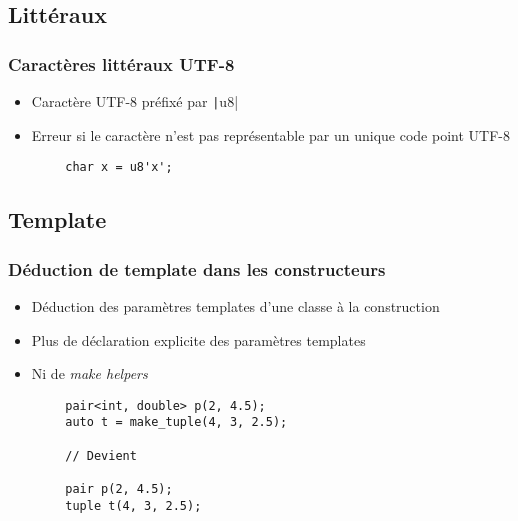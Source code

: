 \documentclass[C++.tex]{subfiles}
\begin{document}
\subsection*{Littéraux}
\begin{frame}[fragile]
	\frametitle{Caractères littéraux UTF-8}
	\begin{itemize}
		\item Caractère UTF-8 préfixé par \texttt|u8|
		\item Erreur si le caractère n'est pas représentable par un unique code point UTF-8
	\end{itemize}

	\begin{verbatim}
		char x = u8'x';
	\end{verbatim}

\end{frame}

\subsection*{Template}
\begin{frame}[fragile]
	\frametitle{Déduction de template dans les constructeurs}
	\begin{itemize}
		\item Déduction des paramètres templates d'une classe à la construction
		\item Plus de déclaration explicite des paramètres templates
		\item Ni de \textit{make helpers}
	\end{itemize}


	\begin{verbatim}
		pair<int, double> p(2, 4.5);
		auto t = make_tuple(4, 3, 2.5);

		// Devient

		pair p(2, 4.5);
		tuple t(4, 3, 2.5);
	\end{verbatim}

\end{frame}
\end{document}
